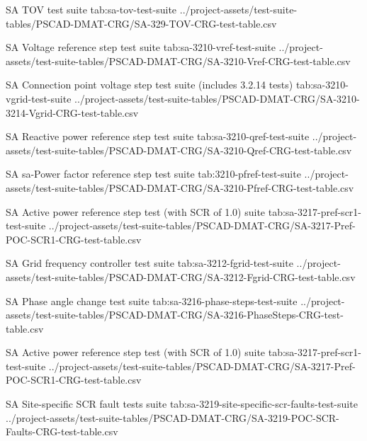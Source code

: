 \documentclass{../grid-link-report}
\newcommand{\projectassetsdir}{../project-assets}
\begin{document}
	{
		\fontsize{6}{8}\selectfont
		\autoscaledlongtable
		{SA TOV test suite}
		{tab:sa-tov-test-suite}
		{\projectassetsdir/test-suite-tables/PSCAD-DMAT-CRG/SA-329-TOV-CRG-test-table.csv}
	}
	
	{
		\fontsize{7}{9}\selectfont
		\autoscaledlongtable
		{SA Voltage reference step test suite}
		{tab:sa-3210-vref-test-suite}
		{\projectassetsdir/test-suite-tables/PSCAD-DMAT-CRG/SA-3210-Vref-CRG-test-table.csv}
	}
	
	{
		\fontsize{7}{9}\selectfont
		\autoscaledlongtable
		{SA Connection point voltage step test suite (includes 3.2.14 tests)}
		{tab:sa-3210-vgrid-test-suite}
		{\projectassetsdir/test-suite-tables/PSCAD-DMAT-CRG/SA-3210-3214-Vgrid-CRG-test-table.csv}
	}
	
	
	{
		\fontsize{7}{9}\selectfont
		\autoscaledlongtable
		{SA Reactive power reference step test suite}
		{tab:sa-3210-qref-test-suite}
		{\projectassetsdir/test-suite-tables/PSCAD-DMAT-CRG/SA-3210-Qref-CRG-test-table.csv}
	}
	
	{
		\fontsize{7}{9}\selectfont
		\autoscaledlongtable
		{SA sa-Power factor reference step test suite}
		{tab:3210-pfref-test-suite}
		{\projectassetsdir/test-suite-tables/PSCAD-DMAT-CRG/SA-3210-Pfref-CRG-test-table.csv}
	}
	
	{
		\fontsize{7}{9}\selectfont
		\autoscaledlongtable
		{SA Active power reference step test (with SCR of 1.0) suite}
		{tab:sa-3217-pref-scr1-test-suite}
		{\projectassetsdir/test-suite-tables/PSCAD-DMAT-CRG/SA-3217-Pref-POC-SCR1-CRG-test-table.csv}
	}
	
	{
		\fontsize{7}{9}\selectfont
		\autoscaledlongtable
		{SA Grid frequency controller test suite}
		{tab:sa-3212-fgrid-test-suite}
		{\projectassetsdir/test-suite-tables/PSCAD-DMAT-CRG/SA-3212-Fgrid-CRG-test-table.csv}
	}
	
	{
		\fontsize{7}{9}\selectfont
		\autoscaledlongtable
		{SA Phase angle change test suite}
		{tab:sa-3216-phase-steps-test-suite}
		{\projectassetsdir/test-suite-tables/PSCAD-DMAT-CRG/SA-3216-PhaseSteps-CRG-test-table.csv}
	}
	
	{
		\fontsize{7}{9}\selectfont
		\autoscaledlongtable
		{SA Active power reference step test (with SCR of 1.0) suite}
		{tab:sa-3217-pref-scr1-test-suite}
		{\projectassetsdir/test-suite-tables/PSCAD-DMAT-CRG/SA-3217-Pref-POC-SCR1-CRG-test-table.csv}
	}
	
	{
		\fontsize{5}{7}\selectfont
		\autoscaledlongtable
		{SA Site-specific SCR fault tests suite}
		{tab:sa-3219-site-specific-scr-faults-test-suite}
		{\projectassetsdir/test-suite-tables/PSCAD-DMAT-CRG/SA-3219-POC-SCR-Faults-CRG-test-table.csv}
	}
	
\end{document}
